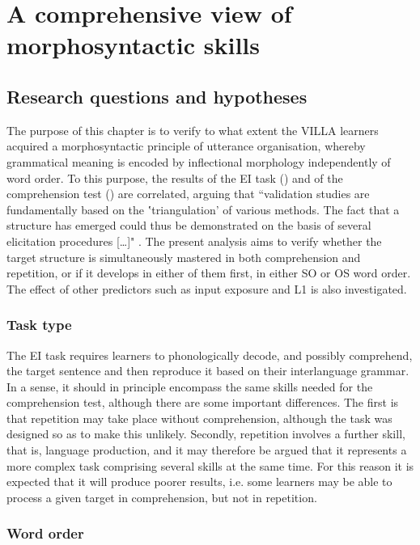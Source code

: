 \chapter{A comprehensive view of morphosyntactic skills}\label{sec:5}
\section{Research questions and hypotheses}\label{sec:06:1}

The purpose of this chapter is to verify to what extent the VILLA learners acquired a morphosyntactic principle of utterance organisation, whereby grammatical meaning is encoded by inflectional morphology independently of word order. To this purpose, the results of the EI task () and of the comprehension test () are correlated, arguing that “validation studies are fundamentally based on the ‛triangulation' of various methods. The fact that a structure has emerged could thus be demonstrated on the basis of several elicitation procedures […]" \citep[326]{Pallotti2006}. The present analysis aims to verify whether the target structure is simultaneously mastered in both comprehension and repetition, or if it develops in either of them first, in either SO or OS word order. The effect of other predictors such as input exposure and L1 is also investigated.

\subsection{Task type}\label{sec:06:1.1}

The EI task requires learners to phonologically decode, and possibly comprehend, the target sentence and then reproduce it based on their interlanguage grammar. In a sense, it should in principle encompass the same skills needed for the comprehension test, although there are some important differences. The first is that repetition may take place without comprehension, although the task was designed so as to make this unlikely. Secondly, repetition involves a further skill, that is, language production, and it may therefore be argued that it represents a more complex task comprising several skills at the same time. For this reason it is expected that it will produce poorer results, i.e. some learners may be able to process a given target in comprehension, but not in repetition.

\subsection{Word order}\label{sec:06:1.2}

